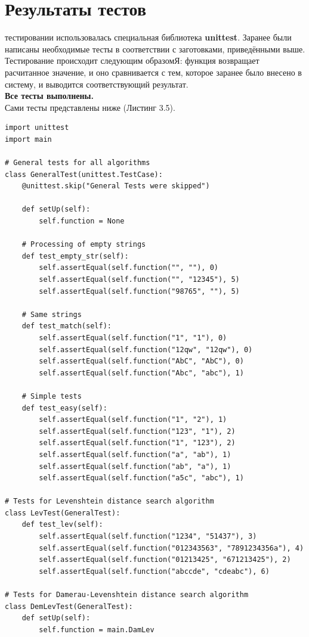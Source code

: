 \documentclass[12pt]{report}
\begin{document}
\section{Результаты тестов}
 тестировании использовалась специальная библиотека \textbf{unittest}. Заранее были написаны необходимые тесты в соответствии с заготовками, приведёнными выше. Тестирование происходит следующим образомЯ: функция возвращает расчитанное значение, и оно сравнивается с тем, которое заранее было внесено в систему, и выводится соответствующий результат.\\

\textbf{Все тесты выполнены.}\\

Сами тесты представлены ниже (Листинг 3.5).
\begin{lstlisting}[label=some-code, caption = Тесты]
import unittest
import main
	
# General tests for all algorithms
class GeneralTest(unittest.TestCase):
	@unittest.skip("General Tests were skipped")
	
	def setUp(self):
		self.function = None
	
	# Processing of empty strings
	def test_empty_str(self):
		self.assertEqual(self.function("", ""), 0)
		self.assertEqual(self.function("", "12345"), 5)
		self.assertEqual(self.function("98765", ""), 5)
	
	# Same strings
	def test_match(self):
		self.assertEqual(self.function("1", "1"), 0)
		self.assertEqual(self.function("12qw", "12qw"), 0)
		self.assertEqual(self.function("AbC", "AbC"), 0)
		self.assertEqual(self.function("Abc", "abc"), 1)
	
	# Simple tests
	def test_easy(self):
		self.assertEqual(self.function("1", "2"), 1)
		self.assertEqual(self.function("123", "1"), 2)
		self.assertEqual(self.function("1", "123"), 2)
		self.assertEqual(self.function("a", "ab"), 1)
		self.assertEqual(self.function("ab", "a"), 1)
		self.assertEqual(self.function("a5c", "abc"), 1)
	
# Tests for Levenshtein distance search algorithm
class LevTest(GeneralTest):
	def test_lev(self):
		self.assertEqual(self.function("1234", "51437"), 3)
		self.assertEqual(self.function("012343563", "7891234356a"), 4)
		self.assertEqual(self.function("01213425", "671213425"), 2)
		self.assertEqual(self.function("abccde", "cdeabc"), 6)
	
# Tests for Damerau-Levenshtein distance search algorithm
class DemLevTest(GeneralTest):
	def setUp(self):
		self.function = main.DamLev
	

\end{lstlisting}
\end{document}
